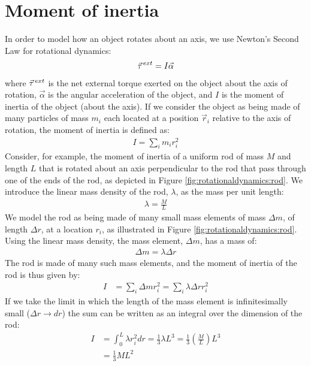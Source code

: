 \section{Moment of inertia}
In order to model how an object rotates about an axis, we use Newton's Second Law for rotational dynamics:
\begin{align*}
\pvec\tau^{ext} = I \vec \alpha
\end{align*}
where $\pvec\tau^{ext}$ is the net external torque exerted on the object about the axis of rotation, $\vec \alpha$ is the angular acceleration of the object, and $I$ is the moment of inertia of the object (about the axis). If we consider the object as being made of many particles of mass $m_i$ each located at a position $\vec r_i$ relative to the axis of rotation, the moment of inertia is defined as:
\begin{align*}
I = \sum_i m_i r_i^2
\end{align*}
Consider, for example, the moment of inertia of a uniform rod of mass $M$ and length $L$ that is rotated about an axis perpendicular to the rod that pass through one of the ends of the rod, as depicted in Figure \ref{fig:rotationaldynamics:rod}.
We introduce the linear mass density of the rod, $\lambda$, as the mass per unit length:
\begin{align*}
\lambda = \frac{M}{L}
\end{align*}
We model the rod as being made of many small mass elements of mass $\Delta m$, of length $\Delta r$, at a location $r_i$, as illustrated in Figure \ref{fig:rotationaldynamics:rod}. Using the linear mass density, the mass element, $\Delta m$, has a mass of:
\begin{align*}
\Delta m = \lambda \Delta r
\end{align*}
The rod is made of many such mass elements, and the moment of inertia of the rod is thus given by:
\begin{align*}
I &= \sum_i \Delta m r_i^2 =\sum_i \lambda \Delta r r_i^2
\end{align*}
If we take the limit in which the length of the mass element is infinitesimally small ($\Delta r \to dr$) the sum can be written as an integral over the dimension of the rod:
\begin{align*}
I &= \int_0^L\lambda r_i^2dr = \frac{1}{3}\lambda L^3 = \frac{1}{3}\left( \frac{M}{L} \right)L^3 \\
&=\frac{1}{3} ML^2
\end{align*}
